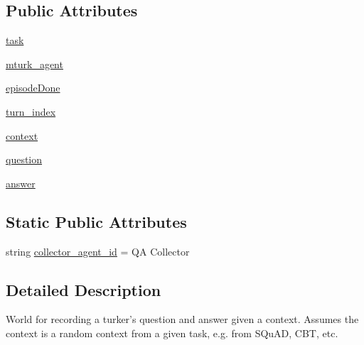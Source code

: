 \subsection*{Public Attributes}
\begin{DoxyCompactItemize}
\item 
\hyperlink{classparlai_1_1mturk_1_1tasks_1_1qa__data__collection_1_1worlds_1_1QADataCollectionWorld_af4920389fe999b17b4ee02cda2cf9bb3}{task}
\item 
\hyperlink{classparlai_1_1mturk_1_1tasks_1_1qa__data__collection_1_1worlds_1_1QADataCollectionWorld_ac14b453b60411faa4311575b04311125}{mturk\+\_\+agent}
\item 
\hyperlink{classparlai_1_1mturk_1_1tasks_1_1qa__data__collection_1_1worlds_1_1QADataCollectionWorld_a6db67da628706c8ecfbacffdbcef307f}{episode\+Done}
\item 
\hyperlink{classparlai_1_1mturk_1_1tasks_1_1qa__data__collection_1_1worlds_1_1QADataCollectionWorld_abff243d566705bf676a2f0a4f0fce0aa}{turn\+\_\+index}
\item 
\hyperlink{classparlai_1_1mturk_1_1tasks_1_1qa__data__collection_1_1worlds_1_1QADataCollectionWorld_aa0dd855f777784dfc16a7dfbf0fe685f}{context}
\item 
\hyperlink{classparlai_1_1mturk_1_1tasks_1_1qa__data__collection_1_1worlds_1_1QADataCollectionWorld_aa775e00aa377673da216b722b81817be}{question}
\item 
\hyperlink{classparlai_1_1mturk_1_1tasks_1_1qa__data__collection_1_1worlds_1_1QADataCollectionWorld_ac49d32ed1e55930adf70fb5c60adc7e0}{answer}
\end{DoxyCompactItemize}
\subsection*{Static Public Attributes}
\begin{DoxyCompactItemize}
\item 
string \hyperlink{classparlai_1_1mturk_1_1tasks_1_1qa__data__collection_1_1worlds_1_1QADataCollectionWorld_a62fa028941dbaef0e64d882a16f855db}{collector\+\_\+agent\+\_\+id} = \textquotesingle{}QA Collector\textquotesingle{}
\end{DoxyCompactItemize}


\subsection{Detailed Description}
\begin{DoxyVerb}World for recording a turker's question and answer given a context.
Assumes the context is a random context from a given task, e.g.
from SQuAD, CBT, etc.
\end{DoxyVerb}
 

